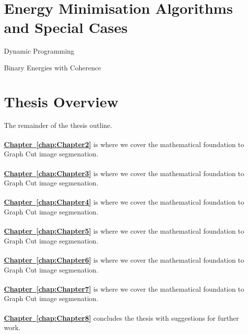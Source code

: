 
\section{Energy Minimisation Algorithms and Special Cases}\label{FillingFile}

Dynamic Programming 

Binary Energies with Coherence


\section{Thesis Overview}

The remainder of the thesis outline.\\
\\
\textbf{\hyperref[chap:Chapter2]{Chapter~\ref*{chap:Chapter2}}} is where we cover the mathematical foundation to Graph Cut image segmenation.\\
\\
\textbf{\hyperref[chap:Chapter3]{Chapter~\ref*{chap:Chapter3}}} is where we cover the mathematical foundation to Graph Cut image segmenation.\\
\\
\textbf{\hyperref[chap:Chapter4]{Chapter~\ref*{chap:Chapter4}}} is where we cover the mathematical foundation to Graph Cut image segmenation.\\
\\
\textbf{\hyperref[chap:Chapter5]{Chapter~\ref*{chap:Chapter5}}} is where we cover the mathematical foundation to Graph Cut image segmenation.\\
\\
\textbf{\hyperref[chap:Chapter6]{Chapter~\ref*{chap:Chapter6}}} is where we cover the mathematical foundation to Graph Cut image segmenation.\\
\\
\textbf{\hyperref[chap:Chapter7]{Chapter~\ref*{chap:Chapter7}}} is where we cover the mathematical foundation to Graph Cut image segmenation.\\
\\
\textbf{\hyperref[chap:Chapter8]{Chapter~\ref*{chap:Chapter8}}} concludes the thesis with suggestions for further work.
